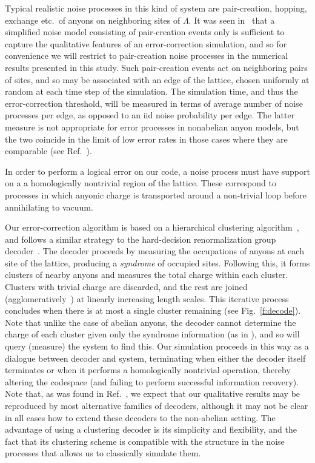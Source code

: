 \documentclass[aps, prl, letterpaper, twocolumn, superscriptaddress, notitlepage, 10pt]{revtex4}
\newcommand{\Fref}[1]{Fig.~\ref{#1}}
\begin{document}
Typical realistic noise processes in this kind of system are 
pair-creation, hopping, exchange etc.~of anyons on neighboring sites of $\Lambda$.
It was seen in~\cite{Brell2013} that a simplified noise model consisting of pair-creation events only 
is sufficient to capture the qualitative features of an error-correction simulation, and so for convenience we 
will restrict to pair-creation noise processes in the numerical results presented in this study. 
Such pair-creation events act on neighboring pairs of sites,
and so may be associated with an edge of the lattice, chosen 
uniformly at random at each time step of the simulation. The simulation time, and thus the 
error-correction threshold, will be measured in terms of average number of noise processes 
per edge, as opposed to an iid noise probability per edge. The latter measure is not 
appropriate for error processes in nonabelian anyon models, but the two coincide in the limit 
of low error rates in those cases where they are comparable (see Ref.~\cite{Brell2013}).

In order to perform a logical error on our code, a noise process must have support on a 
a homologically nontrivial region of the lattice.
These correspond to processes in which anyonic charge is transported around a non-trivial loop before 
annihilating to vacuum.

Our error-correction algorithm is
based on a hierarchical clustering algorithm~\cite{Hastie2009, Wootton2015b},
and follows a similar strategy to the hard-decision renormalization group decoder~\cite{Bravyi2011}. 
The decoder proceeds by measuring the occupations of 
anyons at each site of the lattice, producing a \emph{syndrome} 
of occupied sites. Following this, it forms clusters of nearby anyons and 
measures the total charge within each cluster.
Clusters with trivial charge are discarded, and
the rest are joined (agglomeratively~\cite{Hastie2009})
at linearly increasing length scales. This iterative process concludes when 
there is at most a single cluster remaining (see \Fref{f:decode}).
Note that unlike the case of abelian anyons, the decoder
cannot determine the charge of each cluster given only the syndrome information (as in \cite{Bravyi2011}),
and so will query (measure) the system to find this.
Our simulation proceeds in this way as a dialogue between decoder
and system, terminating when either the decoder itself terminates or 
when it performs a homologically nontrivial operation, thereby altering the 
codespace (and failing to perform successful information recovery).
Note that, as was found in Ref.~\cite{Brell2013}, we expect that 
our qualitative results may be reproduced by most alternative families 
of decoders, although it may not be clear in all cases how to extend these decoders to the non-abelian setting.
The advantage of using a clustering decoder is 
its simplicity and flexibility, and the fact that its clustering 
scheme is compatible with the structure in the noise 
processes that allows us to classically simulate them.
\end{document}
